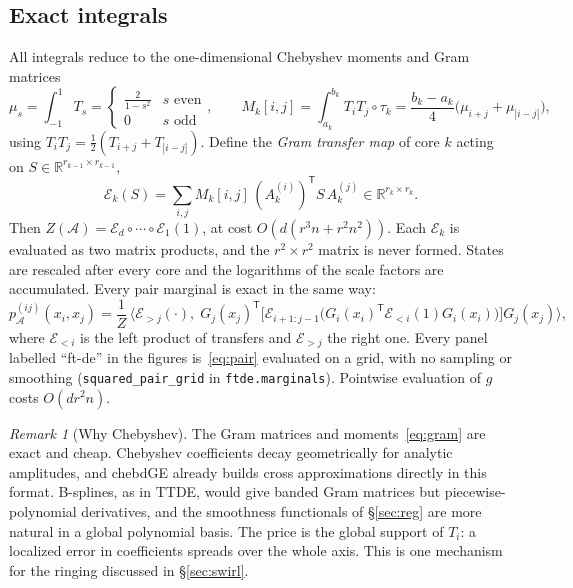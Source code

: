 \documentclass[11pt]{article}
\theoremstyle{definition}
\theoremstyle{remark}
\newtheorem{remark}[proposition]{Remark}
\newcommand{\R}{\mathbb{R}}
\newcommand{\T}{\mathsf{T}}
\begin{document}
\subsection{Exact integrals}
All integrals reduce to the one-dimensional Chebyshev moments and Gram matrices
\begin{equation}\label{eq:gram}
  \mu_s=\int_{-1}^{1}T_s=\begin{cases}\frac{2}{1-s^2}& s\text{ even}\\ 0 & s \text{ odd}\end{cases},\qquad
  M_k[i,j]=\int_{a_k}^{b_k}T_iT_j\circ\tau_k=\frac{b_k-a_k}{4}\bigl(\mu_{i+j}+\mu_{|i-j|}\bigr),
\end{equation}
using $T_iT_j=\tfrac12(T_{i+j}+T_{|i-j|})$. Define the \emph{Gram transfer map} of core $k$ acting on
$S\in\R^{r_{k-1}\times r_{k-1}}$,
\begin{equation}\label{eq:transfer}
  \mathcal E_k(S)=\sum_{i,j}M_k[i,j]\,(A_k^{(i)})^{\T}S\,A_k^{(j)}\in\R^{r_k\times r_k}.
\end{equation}
Then $Z(\mathcal A)=\mathcal E_d\circ\cdots\circ\mathcal E_1(1)$, at cost $O(d(r^3n+r^2n^2))$. Each $\mathcal E_k$ is
evaluated as two matrix products, and the $r^2\times r^2$ matrix is never formed. States are rescaled after every
core and the logarithms of the scale factors are accumulated. Every pair marginal is exact in the same way:
\begin{equation}\label{eq:pair}
  p_{\mathcal A}^{(ij)}(x_i,x_j)=\frac1Z\,\bigl\langle \mathcal E_{>j}(\cdot),\;
  G_j(x_j)^{\T}\bigl[\mathcal E_{i+1:j-1}\bigl(G_i(x_i)^{\T}\mathcal E_{<i}(1)G_i(x_i)\bigr)\bigr]G_j(x_j)\bigr\rangle ,
\end{equation}
where $\mathcal E_{<i}$ is the left product of transfers and $\mathcal E_{>j}$ the right one. Every panel
labelled ``ft-de'' in the figures is~\eqref{eq:pair} evaluated on a grid, with no sampling or smoothing
(\texttt{squared\_pair\_grid} in \texttt{ftde.marginals}). Pointwise evaluation of $g$ costs $O(d r^2 n)$.

\begin{remark}[Why Chebyshev]
The Gram matrices and moments~\eqref{eq:gram} are exact and cheap. Chebyshev coefficients decay geometrically
for analytic amplitudes, and chebdGE already builds cross approximations directly in this format. B-splines, as in
TTDE, would give banded Gram matrices but piecewise-polynomial derivatives, and the smoothness functionals of
\S\ref{sec:reg} are more natural in a global polynomial basis. The price is the global support of $T_i$: a
localized error in coefficients spreads over the whole axis. This is one mechanism for the ringing discussed in
\S\ref{sec:swirl}.
\end{remark}
\end{document}
